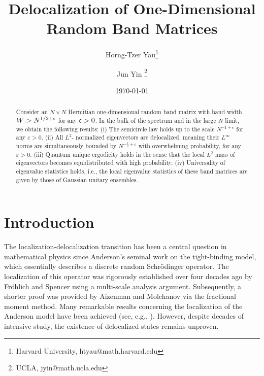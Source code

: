 \documentclass[10pt,reqno]{article}
\title{Delocalization of One-Dimensional Random Band Matrices}
\author{
    Horng-Tzer Yau\thanks{Harvard University, htyau@math.harvard.edu} \and
  Jun Yin \thanks{UCLA, jyin@math.ucla.edu}
}
\date{\today}  %
\theoremstyle{plain} %
\theoremstyle{remark}
\numberwithin{equation}{section}
\begin{document}

 

\maketitle


\begin{abstract}
  

Consider an $ N \times N$ Hermitian one-dimensional random band matrix with  band width $W > N^{1 / 2 + \frak c} $ for any $ {\frak c} > 0$. In the bulk of the spectrum and in the large $ N $ limit, we obtain the following results: (i) The semicircle law holds up to the scale $ N^{-1 + \varepsilon} $ for any $ \varepsilon > 0 $. (ii) All $ L^2 $- normalized eigenvectors are delocalized, meaning their $ L^\infty$ norms are simultaneously bounded by $ N^{-\frac{1}{2} + \varepsilon} $ with overwhelming probability, for any $ \varepsilon > 0 $. (iii) Quantum unique ergodicity holds in the sense that the local $ L^2 $ mass of eigenvectors becomes equidistributed with high probability. (iv) Universality of eigenvalue statistics holds, i.e., the local eigenvalue statistics of these band matrices are given by those of  Gaussian unitary ensembles. 



\end{abstract}

 
\newpage

\tableofcontents

\newpage

 

   


\section{Introduction}


The localization-delocalization transition has been a central question in mathematical physics since Anderson's seminal work on the tight-binding model, which essentially describes a discrete random Schr\"odinger operator. The localization of this operator was rigorously established over four decades ago by Fr{\"o}hlich and Spencer \cite{FroSpen_1983} using a multi-scale analysis argument. Subsequently, a shorter proof was provided by Aizenman and Molchanov \cite{Aizenman1993} via the fractional moment method. Many remarkable results concerning the localization of the Anderson model have been achieved (see, e.g., \cite{FroSpen_1985,Bourgain2005,Carmona1987,DingSmart2020,Damanik2002,Germinet2013,LiZhang2019}). However, despite decades of intensive study, the existence of delocalized states remains unproven.
\end{document}
